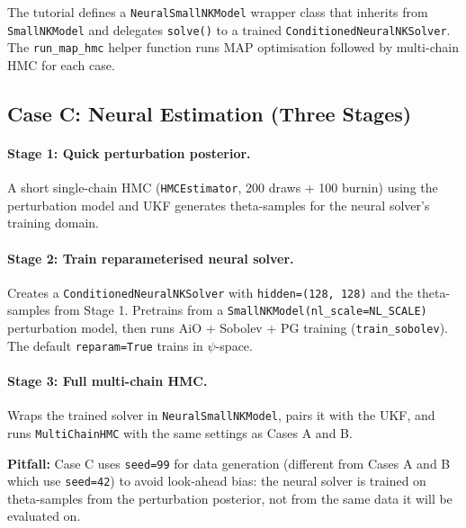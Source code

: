 \documentclass[11pt,a4paper]{article}
\theoremstyle{definition}
\newcommand{\code}[1]{\texttt{\color{codecolor}#1}}
\newcommand{\warn}[1]{\textbf{\color{warncolor}Pitfall:} #1}
\begin{document}
	The tutorial defines a \code{NeuralSmallNKModel} wrapper class that inherits from \code{SmallNKModel} and delegates \code{solve()} to a trained \code{ConditionedNeuralNKSolver}.
	The \code{run\_map\_hmc} helper function runs MAP optimisation followed by multi-chain HMC for each case.
	
	\subsection{Case C: Neural Estimation (Three Stages)}
	
	\paragraph{Stage 1: Quick perturbation posterior.}
	A short single-chain HMC (\code{HMCEstimator}, 200 draws + 100 burnin) using the perturbation model and UKF generates theta-samples for the neural solver's training domain.
	
	\paragraph{Stage 2: Train reparameterised neural solver.}
	Creates a \code{ConditionedNeuralNKSolver} with \code{hidden=(128, 128)} and the theta-samples from Stage 1.
	Pretrains from a \code{SmallNKModel(nl\_scale=NL\_SCALE)} perturbation model, then runs AiO + Sobolev + PG training (\code{train\_sobolev}).
	The default \code{reparam=True} trains in $\psi$-space.
	
	\paragraph{Stage 3: Full multi-chain HMC.}
	Wraps the trained solver in \code{NeuralSmallNKModel}, pairs it with the UKF, and runs \code{MultiChainHMC} with the same settings as Cases A and B.
	
	\warn{Case C uses \code{seed=99} for data generation (different from Cases A and B which use \code{seed=42}) to avoid look-ahead bias: the neural solver is trained on theta-samples from the perturbation posterior, not from the same data it will be evaluated on.}
	
\end{document}
